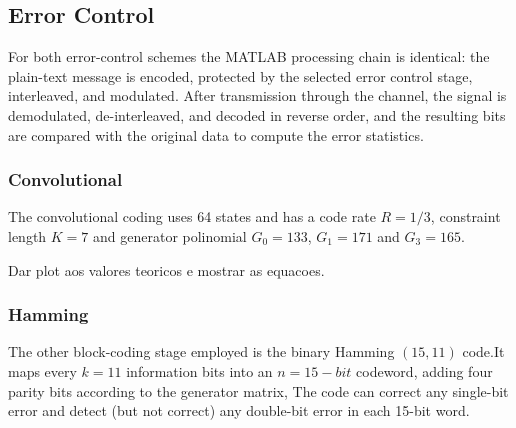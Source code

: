\subsection{Error Control}

For both error-control schemes the MATLAB processing chain is identical: the plain-text message is encoded, protected by the selected error control stage, interleaved, and modulated. After transmission through the channel, the signal is demodulated, de-interleaved, and decoded in reverse order, and the resulting bits are compared with the original data to compute the error statistics.

\subsubsection{Convolutional}

The convolutional coding uses 64 states and has a code rate $R = 1/3$, constraint length $K = 7$ and generator polinomial $G_0 = 133$, $G_1=171$ and $G_3 = 165$. 


Dar plot aos valores teoricos e mostrar as equacoes.

\subsubsection{Hamming}

The other block-coding stage employed is the binary Hamming $(15,11)$ code.It maps every $k=11$ information bits into an $n=15-bit$ codeword, adding four parity bits according to the generator matrix, The code can correct any single-bit error and detect (but not correct) any double-bit error in each 15-bit word.

